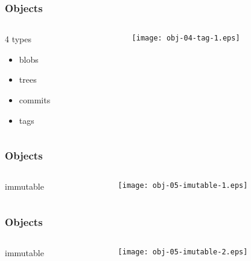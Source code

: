 \documentclass[english]{beamer}
\newcommand{\faint}[1]{%
\textcolor{code-gray}{#1}%
}
\begin{document}
\begin{frame}
\frametitle{Objects}
\begin{columns}[t]
        \begin{column}[T]{.5\textwidth}
                4 types
                \begin{itemize}
                        \item \faint{blobs}
                        \item \faint{trees}
                        \item \faint{commits}
                        \item tags
                \end{itemize}
        \end{column}
        \begin{column}[T]{.5\textwidth}
                \texttt{[image: obj-04-tag-1.eps]}
        \end{column}
\end{columns}
\end{frame}

\begin{frame}
\frametitle{Objects}
\begin{columns}[t]
        \begin{column}[T]{.5\textwidth}
                immutable
        \end{column}
        \begin{column}[T]{.5\textwidth}
                \texttt{[image: obj-05-imutable-1.eps]}
        \end{column}
\end{columns}
\end{frame}

\begin{frame}
\frametitle{Objects}
\begin{columns}[t]
        \begin{column}[T]{.5\textwidth}
                immutable
        \end{column}
        \begin{column}[T]{.5\textwidth}
                \texttt{[image: obj-05-imutable-2.eps]}
        \end{column}
\end{columns}
\end{frame}
\end{document}
